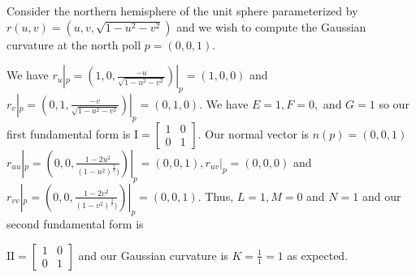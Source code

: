 \begin{example}\label{ex:compute-surface-curvature}
Consider the northern hemisphere of the unit sphere parameterized
by $r(u,v)=(u,v,\sqrt{1-u^2-v^2})$ and we wish to compute the Gaussian curvature at
the north poll $p=(0,0,1)$.

We have $r_u|_p=(1,0,\frac{-u}{\sqrt{1-u^2-v^2}})|_p=(1,0,0)$ and
$r_v|_p=(0,1,\frac{-v}{\sqrt{1-u^2-v^2}})|_p=(0,1,0)$.
We have $E=1, F=0,$ and $G=1$ so our first fundamental form is
$\mathrm{I}=\begin{bmatrix}
1 & 0 \\
0 & 1 
\end{bmatrix}.$
Our normal vector is $n(p)=(0,0,1)$ $r_{uu}|_p=(0,0,\frac{1-2u^2}{(1-u^2)^{\frac{3}{2}})})|_p=(0,0,1),
r_{uv}|_p=(0,0,0)$ and $r_{vv}|_p=(0,0,\frac{1-2v^2}{(1-v^2)^{\frac{3}{2}})})|_p=(0,0,1).$
Thus, $L=1, M=0$ and $N=1$ and our second fundamental form is

$\mathrm{I\!I}=\begin{bmatrix}
1 & 0 \\
0 & 1 
\end{bmatrix}$
and our Gaussian curvature is $K=\frac{1}{1}=1$ as expected.

\end{example}


